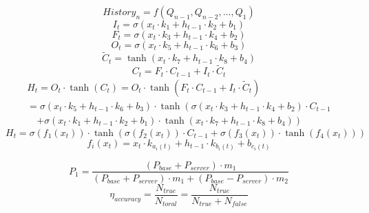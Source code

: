 \begin{equation}History_{n}=f\left(Q_{n-1},Q_{n-2},\ldots,Q_{1}\right)\end{equation}
\begin{equation}I_{t}=\sigma(x_{t}\cdot k_{1}+h_{t-1}\cdot k_{2}+b_{1})\end{equation}
\begin{equation}F_{t}=\sigma(x_{t}\cdot k_{3}+h_{t-1}\cdot k_{4}+b_{2})\end{equation}
\begin{equation}O_{t}=\sigma(x_{t}\cdot k_{5}+h_{t-1}\cdot k_{6}+b_{3})\end{equation}
\begin{equation}\tilde{C}_{t}=\tanh\left(x_{t}\cdot k_{7}+h_{t-1}\cdot k_{8}+b_{4}\right)\end{equation}
\begin{equation}C_{t}=F_{t}\cdot C_{t-1}+I_{t}\cdot \tilde C_{t}\end{equation}
\begin{equation}
\begin{gathered}
    H_{t} = O_{t} \cdot \tanh(C_{t}) = O_{t} \cdot \tanh\left(F_{t} \cdot C_{t-1} + I_{t} \cdot \tilde C_{t}\right) \\
    = \sigma(x_{t} \cdot k_{5} + h_{t-1} \cdot k_{6} + b_{3}) \cdot \tanh\left(\sigma(x_{t} \cdot k_{3} + h_{t-1} \cdot k_{4} + b_{2}) \cdot C_{t-1} \right.\\
    \quad \left. + \sigma(x_{t} \cdot k_{1} + h_{t-1} \cdot k_{2} + b_{1}) \cdot \tanh\left(x_{t} \cdot k_{7} + h_{t-1} \cdot k_{8} + b_{4}\right)\right)
\end{gathered}
\end{equation}
\begin{equation}H_{t} = \sigma\left( f_{1}(x_{t}) \right) \cdot \tanh\left( \sigma(f_{2}(x_{t})) \cdot C_{t-1} + \sigma(f_{3}(x_{t})) \cdot \tanh(f_{4}(x_{t})) \right)\end{equation}
\begin{equation}
f_{i}(x_{t}) = x_{t}\cdot k_{a_{i}(t)} + h_{t-1} \cdot k_{b_{i}(t)} + b_{c_{i}(t)}
\end{equation}

\begin{equation}P_{1} = \frac{\left( P_{base} + P_{server} \right)\cdot m_{1}}{\left( P_{base} + P_{server} \right) \cdot  m_{1} +\left( P_{base} -P_{server} \right) \cdot m_{2} } 
\end{equation}
\begin{equation}\eta_{accuracy}=\frac{N_{true}}{N_{toral}}=\frac{N_{true}}{N_{true}+N_{false}}\end{equation}

